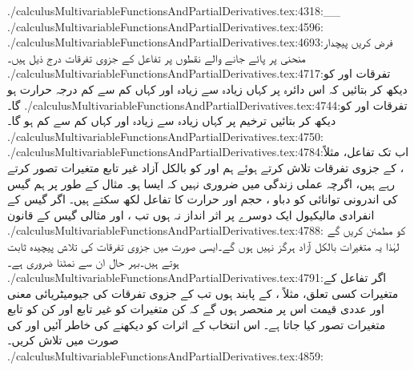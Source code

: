 ./calculusMultivariableFunctionsAndPartialDerivatives.tex:4318:_{}\quad {}\quad {}_{}
./calculusMultivariableFunctionsAndPartialDerivatives.tex:4596:\\
./calculusMultivariableFunctionsAndPartialDerivatives.tex:4693:فرض کریں پیچدار منحنی  پر  پائے جانے والے نقطوں پر تفاعل   کے جزوی تفرقات درج ذیل ہیں۔
./calculusMultivariableFunctionsAndPartialDerivatives.tex:4717:تفرقات  اور  کو دیکھ کر بتائیں کہ اس دائرہ پر کہاں زیادہ سے زیادہ اور کہاں کم سے کم درجہ حرارت ہو گا۔
./calculusMultivariableFunctionsAndPartialDerivatives.tex:4744:تفرقات  اور  کو دیکھ کر بتائیں  ترخیم پر  کہاں زیادہ سے زیادہ  اور  کہاں کم سے کم     ہو گا۔
./calculusMultivariableFunctionsAndPartialDerivatives.tex:4750:\\
./calculusMultivariableFunctionsAndPartialDerivatives.tex:4784:اب تک تفاعل، مثلاً  ،    کے جزوی تفرقات تلاش کرتے ہوئے  ہم  اور  کو بالکل آزاد  غیر تابع متغیرات تصور کرتے رہے ہیں، اگرچہ  عملی زندگی میں ضروری نہیں کہ ایسا ہو۔ مثال کے طور پر ہم گیس کی اندرونی  توانائی   کو دباو ، حجم  اور حرارت  کا تفاعل  لکھ سکتے ہیں۔ اگر گیس کے انفرادی مالیکیول ایک دوسرے  پر اثر انداز نہ ہوں تب  ،  اور   مثالی گیس کے    قانون
./calculusMultivariableFunctionsAndPartialDerivatives.tex:4788: کو مطمئن کریں گے لہٰذا یہ متغیرات بالکل آزاد ہرگز نہیں ہوں گے۔ایسی صورت میں جزوی تفرقات کی تلاش  پیچیدہ ثابت ہوتے ہیں۔بہر حال ان سے نمٹنا ضروری ہے۔ 
./calculusMultivariableFunctionsAndPartialDerivatives.tex:4791:اگر تفاعل  کے متغیرات کسی تعلق، مثلاً ، کے پابند ہوں تب  کے جزوی تفرقات کی جیومیٹریائی  معنی اور عددی قیمت  اس پر منحصر ہوں گے کہ کن متغیرات کو غیر تابع اور کن کو تابع متغیرات تصور کیا جاتا ہے۔ اس انتخاب کے اثرات کو دیکھنے کی خاطر آئیں   اور  کی صورت میں  تلاش کریں۔ 
./calculusMultivariableFunctionsAndPartialDerivatives.tex:4859:\caption{نقطہ  کو پابند کرنے سے جزوی تفرقات کے مختلف نتائج حاصل ہوں گے۔}
